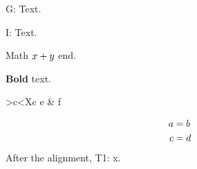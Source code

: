 \documentclass{article}
\begin{document}
G: Text.

I: Text.

Math $x\index{inmath}+y$ end.

\textbf{Bold} text.

\begin{tabular}{>{\bfseries}c<{X}c}
e & f\\
\end{tabular}

\begin{align}
a\index{x&y} &= b \\
c &= d
\end{align}
After the alignment, T1: x.
\begin{theindex}\end{theindex}
\newenvironment{theglossary}{}{}\makeatletter{}\makeatother
\end{document}
